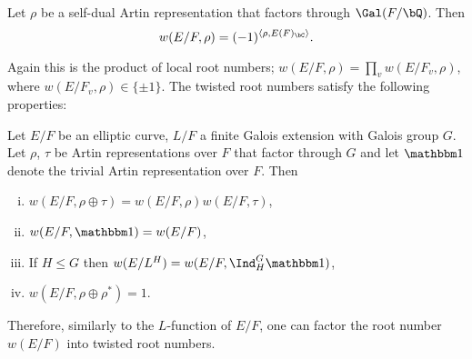 \begin{conj}
   Let $\rho$ be a self-dual Artin representation that factors through $\Gal(F / \bQ)$. Then $$ w(E / F, \rho) = (-1)^{\langle \rho, E(F)_{\bC} \rangle}.$$
\end{conj}

Again this is the product of local root numbers; $w(E / F, \rho) = \prod_v w(E / F_v, \rho)$, where $w(E / F_v, \rho) \in \{ \pm 1\}$. The twisted root numbers satisfy the following properties:

\begin{prop}\cite[Lemma A.1, Proposition A.2]{reg-const}\label{compute-root-twist}
    Let $E / F$ be an elliptic curve, $L / F$ a finite Galois extension with Galois group $G$. Let $\rho$, $\tau$ be Artin representations over $F$ that factor through $G$ and let $\trivial$ denote the trivial Artin representation over $F$. Then
    \begin{enumerate}[(i)]
        \setlength\itemsep{0em}
        \item $w(E / F, \rho \oplus \tau) = w(E / F, \rho) w(E / F, \tau)$,
        \item $w(E / F, \trivial) = w(E/ F)$, 
        \item If $H \leq G$ then $w(E / L^H) = w(E/ F, \Ind_{H}^G \trivial)$, 
        \item $w(E / F, \rho \oplus \rho^*) = 1$.
    \end{enumerate}
\end{prop}

Therefore, similarly to the $L$-function of $E / F$, one can factor the root number $w(E / F)$ into twisted root numbers.
